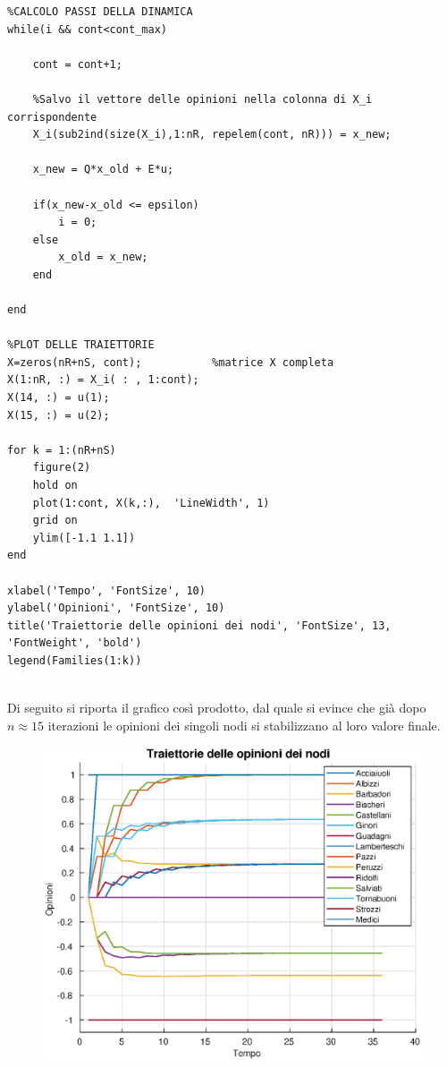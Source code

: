 \documentclass[13pt,largemargins]{homework}
\begin{document}
\begin{enumerate}[label=(\alph*)]
\begin{lstlisting}
%CALCOLO PASSI DELLA DINAMICA
while(i && cont<cont_max)
   
    cont = cont+1; 
    
    %Salvo il vettore delle opinioni nella colonna di X_i corrispondente
    X_i(sub2ind(size(X_i),1:nR, repelem(cont, nR))) = x_new; 
    
    x_new = Q*x_old + E*u;
    
    if(x_new-x_old <= epsilon)
        i = 0; 
    else
        x_old = x_new; 
    end
    
end

%PLOT DELLE TRAIETTORIE 
X=zeros(nR+nS, cont); 			%matrice X completa
X(1:nR, :) = X_i( : , 1:cont); 
X(14, :) = u(1); 
X(15, :) = u(2);

for k = 1:(nR+nS)
    figure(2)
    hold on
    plot(1:cont, X(k,:),  'LineWidth', 1)
    grid on 
    ylim([-1.1 1.1])		
end

xlabel('Tempo', 'FontSize', 10)
ylabel('Opinioni', 'FontSize', 10)
title('Traiettorie delle opinioni dei nodi', 'FontSize', 13, 'FontWeight', 'bold')
legend(Families(1:k))


\end{lstlisting}


Di seguito si riporta il grafico così prodotto, dal quale si evince che già dopo $n\approx15$ iterazioni le opinioni dei singoli nodi si stabilizzano al loro valore finale.

\begin{figure}[h]
\centering
\includegraphics[scale=0.6]{traiettorie}%
\end{figure}


\end{enumerate}
\end{document}
